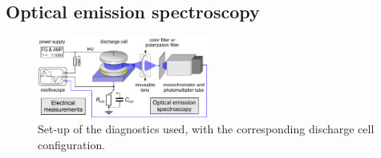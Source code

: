 \documentclass[a4paper,10pt,twoside]{article}
\begin{document}
		\subsection{Optical emission spectroscopy}\label{subsec:oes}
		
				\begin{figure}
					\centering
					\includegraphics[width=0.5\textwidth]{figures/setup/setup}
					\caption{Set-up of the diagnostics used, with the corresponding discharge cell configuration.}
					\label{img:diag}
				\end{figure}
		
\end{document}
